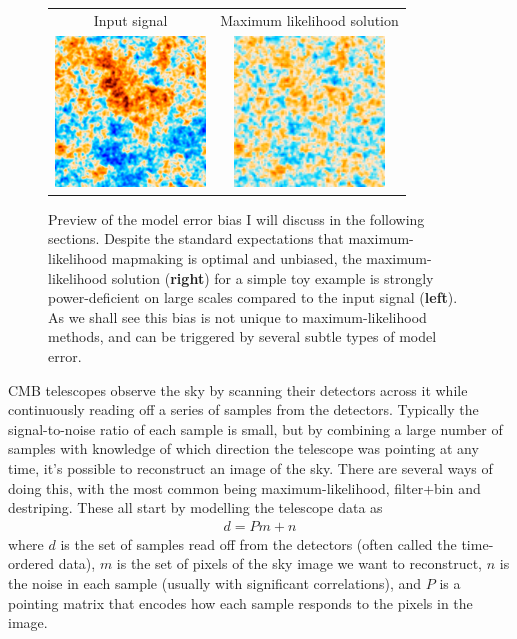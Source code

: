 \documentclass[twocolumn,apj]{aastex63}
\newcommand{\dfn}[1]{\textbf{#1}}
\newenvironment{closetabcols}[1][0.5mm]{\setlength{\tabcolsep}{#1}}{}
\begin{document}
\begin{figure}
	\centering
	\begin{closetabcols}
	\begin{tabular}{cc}
		Input signal & Maximum likelihood solution \\
		\includegraphics[width=40mm]{subpix/toy2d_input_signal_map.png} &
		\includegraphics[width=40mm]{subpix/toy2d_ml_nn_signal_map.png} \\
	\end{tabular}
	\end{closetabcols}
	\caption{Preview of the model error bias I will discuss in the following
	sections. Despite the standard expectations that maximum-likelihood mapmaking
	is optimal and unbiased, the maximum-likelihood solution (\dfn{right})
	for a simple toy example is strongly power-deficient on large scales
	compared to the input signal (\dfn{left}). As we shall see this bias
	is not unique to maximum-likelihood methods, and can be triggered by
	several subtle types of model error.}
	\label{fig:maps-2d}
\end{figure}

CMB telescopes observe the sky by scanning their detectors across
it while continuously reading off a series of samples from the
detectors. Typically the signal-to-noise ratio of each sample is
small, but by combining a large number of samples with knowledge
of which direction the telescope was pointing at any time, it's
possible to reconstruct an image of the sky. There are several
ways of doing this, with the most common being maximum-likelihood,
filter+bin and destriping. These all start by modelling the
telescope data as \citep{tegmark-mapmaking}
\begin{align}
	d = Pm + n \label{eq:model}
\end{align}
where $d$ is the set of samples read off from the detectors
(often called the time-ordered data), $m$ is the set of pixels
of the sky image we want to reconstruct, $n$ is the noise
in each sample (usually with significant correlations), and
$P$ is a pointing matrix that encodes how each sample responds
to the pixels in the image.
\end{document}
